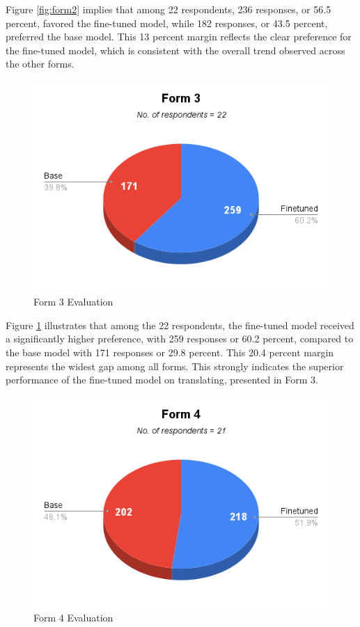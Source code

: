 Figure \ref{fig:form2} implies that among 22 respondents, 236 responses, or 56.5 percent, favored the fine-tuned model, while 182 responses, or 43.5 percent, preferred the base model. This 13 percent margin reflects the clear preference for the fine-tuned model, which is consistent with the overall trend observed across the other forms. 

\begin{figure}[htbp]
	\centering
	\includegraphics[scale=0.7]{figures/Form3.png}
	\caption{Form 3 Evaluation}
	\label{fig:form3}
\end{figure}

Figure \ref{fig:form3} illustrates that among the 22 respondents, the fine-tuned model received a significantly higher preference, with 259 responses or 60.2 percent, compared to the base model with 171 responses or 29.8 percent. This 20.4 percent margin represents the widest gap among all forms. This strongly indicates the superior performance of the fine-tuned model on translating, presented in Form 3. 

\begin{figure}[htbp]
	\centering
	\includegraphics[scale=0.7]{figures/Form4.png}
	\caption{Form 4 Evaluation}
	\label{fig:form4}
\end{figure}

